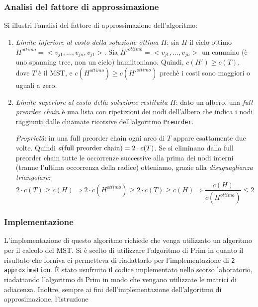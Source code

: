 \subsubsection{Analisi del fattore di approssimazione}
Si illustri l'analisi del fattore di approssimazione dell'algoritmo:
\begin{enumerate}
    \item \textit{Limite inferiore al costo della soluzione ottima $H$}: sia $H$ il ciclo
    ottimo $H^{ottimo} = <v_{j1}, ..., v_{jn}, v_{j1}>$.
    Sia $H'^{ottimo} = <v_{j1}, ..., v_{jn}>$ un cammino
    (è uno spanning tree, non un ciclo) hamiltoniano. Quindi, $c(H') \ge c(T)$, dove $T$ è
    il MST, e $c(H^{ottimo}) \ge c(H'^{ottimo})$ prechè i costi sono maggiori o uguali a zero.

    \item \textit{Limite superiore al costo della soluzione restituita $H$}: dato un albero,
    una \textit{full preorder chain} è una lista con ripetizioni dei nodi dell'albero che
    indica i nodi raggiunti dalle chiamate ricorsive dell'algoritmo \verb|Preorder|.

    \textit{Proprietà}: in una full preorder chain ogni arco di $T$ appare esattamente due
    volte. Quindi $c(\textnormal{full preorder chain}) = 2 \cdot c(T)$. Se si eliminano
    dalla full preorder chain tutte le occorrenze successive alla prima dei nodi interni
    (tranne l'ultima occorrenza della radice) otteniamo, grazie alla
    \textit{disuguaglianza triangolare}:
    \[
        2 \cdot c(T) \ge c(H) \Rightarrow 2 \cdot c(H^{ottimo}) \ge 2 \cdot c(T) \ge c(H)
        \Rightarrow \frac{c(H)}{c(H^{ottimo})} \le 2
    \]

\end{enumerate}

\subsubsection{Implementazione}

L'implementazione di questo algoritmo richiede che venga utilizzato un algoritmo per il 
calcolo del MST. Si è scelto di utilizzare l'algoritmo di Prim in quanto il risultato 
che forniva ci permetteva di riadattarlo per l'implementazione di \verb|2-approximation|.
È stato usufruito il codice implementato nello scorso laboratorio, riadattando 
l'algoritmo di Prim in modo che vengano utilizzate le matrici di adiacenza. 
\label{cambio_istruzione_prim}
Inoltre, sempre ai fini dell'implementazione dell'algoritmo di approsimazione, 
l'istruzione 

